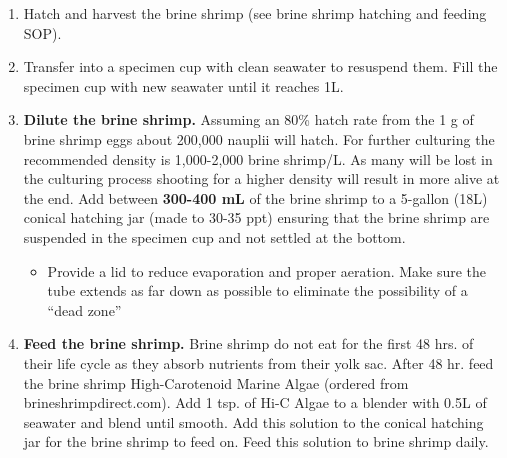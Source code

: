 \documentclass[
  letterpaper,
  DIV=11,
  numbers=noendperiod]{scrreprt}
\providecommand{\tightlist}{%
  \setlength{\itemsep}{0pt}\setlength{\parskip}{0pt}}\usepackage{longtable,booktabs,array}
\begin{document}
\begin{enumerate}
\def\labelenumi{\arabic{enumi}.}
\item
  Hatch and harvest the brine shrimp (see brine shrimp hatching and
  feeding SOP).
\item
  Transfer into a specimen cup with clean seawater to resuspend them.
  Fill the specimen cup with new seawater until it reaches 1L.
\item
  \textbf{Dilute the brine shrimp.} Assuming an 80\% hatch rate from the
  1 g of brine shrimp eggs about 200,000 nauplii will hatch. For further
  culturing the recommended density is 1,000-2,000 brine shrimp/L. As
  many will be lost in the culturing process shooting for a higher
  density will result in more alive at the end. Add between
  \textbf{300-400 mL} of the brine shrimp to a 5-gallon (18L) conical
  hatching jar (made to 30-35 ppt) ensuring that the brine shrimp are
  suspended in the specimen cup and not settled at the bottom.

  \begin{itemize}
  \tightlist
  \item
    Provide a lid to reduce evaporation and proper aeration. Make sure
    the tube extends as far down as possible to eliminate the
    possibility of a ``dead zone''
  \end{itemize}
\item
  \textbf{Feed the brine shrimp.} Brine shrimp do not eat for the first
  48 hrs. of their life cycle as they absorb nutrients from their yolk
  sac. After 48 hr. feed the brine shrimp High-Carotenoid Marine Algae
  (ordered from brineshrimpdirect.com). Add 1 tsp. of Hi-C Algae to a
  blender with 0.5L of seawater and blend until smooth. Add this
  solution to the conical hatching jar for the brine shrimp to feed on.
  Feed this solution to brine shrimp daily.


\end{enumerate}
\end{document}
